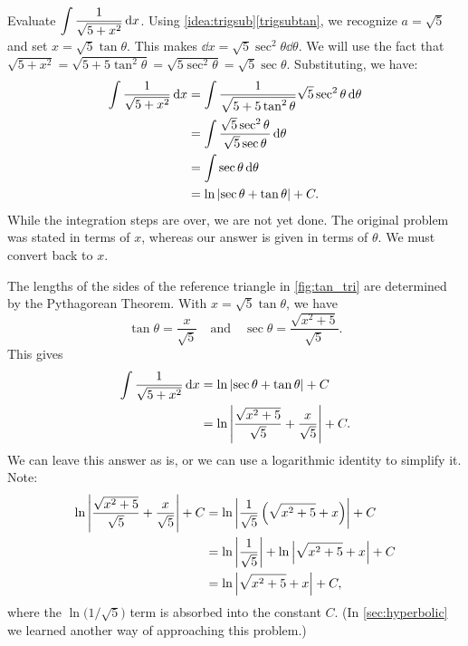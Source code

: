 \begin{example}\label{ex_trigsub3}%
Evaluate $\displaystyle \int \frac{1}{\sqrt{5+x^2}}\operatorname{d}\! x$.
\solution
Using \autoref{idea:trigsub}\ref*{trigsubtan}, we recognize $a=\sqrt{5}$ and  set $x= \sqrt{5}\tan \theta$. This makes $\dd x = \sqrt{5}\sec^2\theta\dd\theta$. We will use the fact that $\sqrt{5+x^2} = \sqrt{5+5\tan^2\theta} = \sqrt{5\sec^2\theta} = \sqrt{5}\sec\theta.$ Substituting, we have:
\begin{align*}
\int \frac{1}{\sqrt{5+x^2}}\operatorname{d}\! x &= \int \frac{1}{\sqrt{5+5\tan^2\theta}}\sqrt{5}\sec^2\theta\operatorname{d}\!\theta \\
			&= \int \frac{\sqrt{5}\sec^2\theta}{\sqrt{5}\sec\theta} \operatorname{d}\!\theta\\
			&= \int \sec\theta\operatorname{d}\!\theta\\
			&= \ln\left\lvert \sec\theta+\tan\theta \right\rvert+C.
\end{align*}
While the integration steps are over, we are not yet done. The original problem was stated in terms of $x$, whereas our answer is given in terms of $\theta$. We must convert back to $x$.

The lengths of the sides of the reference triangle in \autoref{fig:tan_tri} are determined by the Pythagorean Theorem. With $x=\sqrt{5}\tan\theta$, we have 
\[\tan \theta = \frac x{\sqrt{5}}\quad \text{and}\quad \sec\theta = \frac{\sqrt{x^2+5}}{\sqrt{5}}.\]
This gives\vspace{-.3\baselineskip}
\begin{align*}
	\int\frac1{\sqrt{5+x^2}}\operatorname{d}\! x
	&= \ln\left\lvert \sec\theta+\tan\theta \right\rvert+C \\
	&= \ln\left\lvert \frac{\sqrt{x^2+5}}{\sqrt5}+ \frac x{\sqrt5} \right\rvert+C.
\end{align*}
We can leave this answer as is, or we can use a logarithmic identity to simplify it. Note:\vspace{-.3\baselineskip}
\begin{align*}
	\ln\left\lvert \frac{\sqrt{x^2+5}}{\sqrt5}+ \frac x{\sqrt5} \right\rvert+C
	&= \ln\left\lvert \frac1{\sqrt5}\left(\sqrt{x^2+5}+ x\right) \right\rvert+C \\
	&= \ln\left\lvert \frac1{\sqrt5} \right\rvert + \ln\left\lvert \sqrt{x^2+5}+ x \right\rvert+C\\
	&=	\ln\left\lvert \sqrt{x^2+5}+ x \right\rvert+C,
\end{align*}
where the $\ln\bigl(1/\sqrt5\bigr)$ term is absorbed into the constant $C$. (In \autoref{sec:hyperbolic} we learned another way of approaching this problem.)
\end{example}


